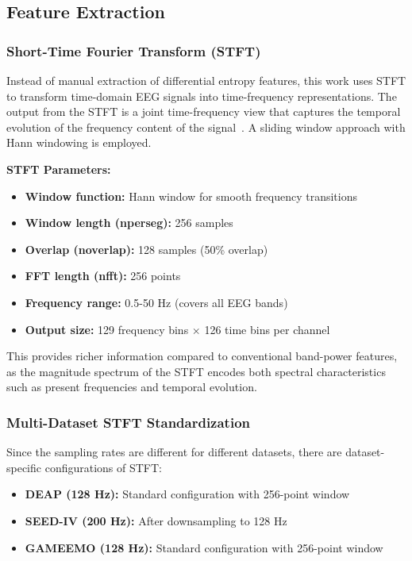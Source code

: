 \documentclass[conference]{IEEEtran}
\begin{document}
\subsection{Feature Extraction}

\subsubsection{Short-Time Fourier Transform (STFT)}

Instead of manual extraction of differential entropy features, this work uses STFT to transform time-domain EEG signals into time-frequency representations. The output from the STFT is a joint time-frequency view that captures the temporal evolution of the frequency content of the signal~\cite{zhang2025emotion}. A sliding window approach with Hann windowing is employed.

\textbf{STFT Parameters:}
\begin{itemize}
    \item \textbf{Window function:} Hann window for smooth frequency transitions
    \item \textbf{Window length (nperseg):} 256 samples
    \item \textbf{Overlap (noverlap):} 128 samples (50\% overlap)
    \item \textbf{FFT length (nfft):} 256 points
    \item \textbf{Frequency range:} 0.5-50 Hz (covers all EEG bands)
    \item \textbf{Output size:} 129 frequency bins $\times$ 126 time bins per channel
\end{itemize}

This provides richer information compared to conventional band-power features, as the magnitude spectrum of the STFT encodes both spectral characteristics such as present frequencies and temporal evolution.

\subsubsection{Multi-Dataset STFT Standardization}

Since the sampling rates are different for different datasets, there are dataset-specific configurations of STFT:

\begin{itemize}
    \item \textbf{DEAP (128 Hz):} Standard configuration with 256-point window
    \item \textbf{SEED-IV (200 Hz):} After downsampling to 128 Hz
    \item \textbf{GAMEEMO (128 Hz):} Standard configuration with 256-point window
\end{itemize}
\end{document}

